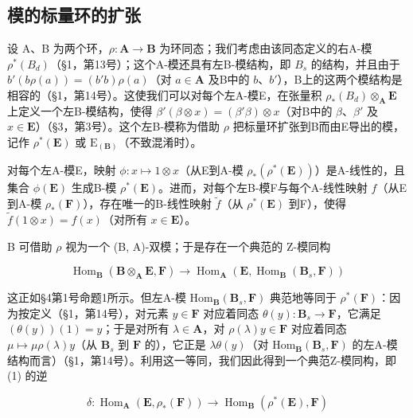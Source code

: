 \subsection{模的标量环的扩张}

设 A、B 为两个环，\(\rho: \mathbf{A} \to \mathbf{B}\) 为环同态；我们考虑由该同态定义的右A-模 \(\rho^{*}(B_{d})\)（§1，第13号）；这个A-模还具有左B-模结构，即 \(B_{s}\) 的结构，并且由于 \(b'(b\rho(a)) = (b'b)\rho(a)\)（对 \(a \in \mathbf{A}\) 及B中的 \(b\)、\(b'\)），B上的这两个模结构是相容的（§1，第14号）。这使我们可以对每个左A-模E，在张量积 \(\rho_{*}(B_{d}) \otimes_{\mathbf{A}} \mathbf{E}\) 上定义一个左B-模结构，使得 \(\beta'(\beta \otimes x) = (\beta'\beta) \otimes x\)（对B中的 \(\beta\)、\(\beta'\) 及 \(x \in \mathbf{E}\)）（§3，第3号）。这个左B-模称为借助 \(\rho\) 把标量环扩张到B而由E导出的模，记作 \(\rho^{*}(\mathbf{E})\) 或 \(\mathrm{E}_{(\mathbf{B})}\)（不致混淆时）。

对每个左A-模E，映射 \(\phi: x \mapsto 1 \otimes x\)（从E到A-模 \(\rho_*(\rho^*(\mathbf{E}))\)）是A-线性的，且集合 \(\phi(\mathbf{E})\) 生成B-模 \(\rho^*(\mathbf{E})\)。进而，对每个左B-模F与每个A-线性映射 \(f\)（从E到A-模 \(\rho_*(\mathbf{F})\)），存在唯一的B-线性映射 \(\tilde{f}\)（从 \(\rho^*(\mathbf{E})\) 到F），使得 \(\tilde{f}(1 \otimes x) = f(x)\)（对所有 \(x \in \mathbf{E}\)）。

B 可借助 \(\rho\) 视为一个 (B, A)-双模；于是存在一个典范的 Z-模同构

\[
\operatorname{Hom} _ {\mathbf {B}} (\mathbf {B} \otimes_ {\mathbf {A}} \mathbf {E}, \mathbf {F}) \rightarrow \operatorname{Hom} _ {\mathbf {A}} (\mathbf {E}, \operatorname{Hom} _ {\mathbf {B}} (\mathbf {B} _ {s}, \mathbf {F}))\tag{1}
\]

这正如§4第1号命题1所示。但左A-模 \(\mathrm{Hom}_{\mathbf{B}}(\mathbf{B}_{s},\mathbf{F})\) 典范地等同于 \(\rho^{*}(\mathbf{F})\)：因为按定义（§1，第14号），对元素 \(y\in \mathbf{F}\) 对应着同态 \(\theta (y)\colon \mathbf{B}_s\to \mathbf{F}\)，它满足 \((\theta (y))(1) = y\)；于是对所有 \(\lambda \in \mathbf{A}\)，对 \(\rho (\lambda)y\in \mathbf{F}\) 对应着同态 \(\mu \mapsto \mu \rho (\lambda)y\)（从 \(\mathbf{B}_s\) 到 \(\mathbf{F}\) 的），它正是 \(\lambda \theta (y)\)（对 \(\mathrm{Hom}_{\mathbf{B}}(\mathbf{B}_{s},\mathbf{F})\) 的左A-模结构而言）（§1，第14号）。利用这一等同，我们因此得到一个典范Z-模同构，即 (1) 的逆

\[
\delta : \operatorname{Hom} _ {\mathbf {A}} (\mathbf {E}, \rho_ {*} (\mathbf {F})) \rightarrow \operatorname{Hom} _ {\mathbf {B}} (\rho^ {*} (\mathbf {E}), \mathbf {F})\tag{2}
\]

